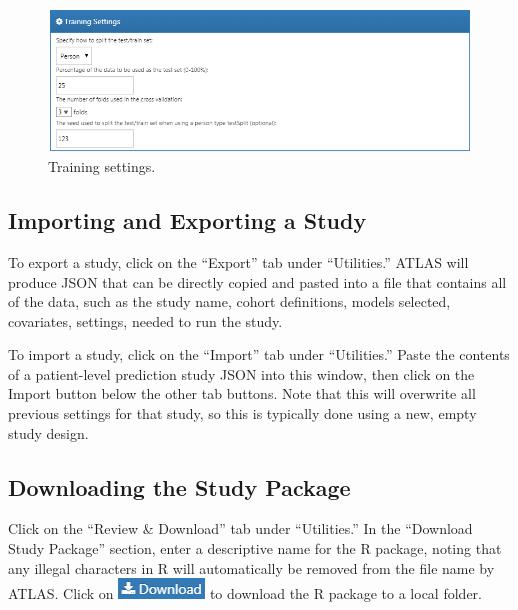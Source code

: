 \documentclass[
  11pt]{book}
\theoremstyle{definition}
\theoremstyle{definition}
\theoremstyle{definition}
\theoremstyle{definition}
\theoremstyle{remark}
\begin{document}
\begin{figure}

{\centering \includegraphics[width=1\linewidth]{images/PatientLevelPrediction/trainingSettings} 

}

\caption{Training settings.}\label{fig:trainingSettings}
\end{figure}

\subsection{Importing and Exporting a Study}\label{importing-and-exporting-a-study}

To export a study, click on the ``Export'' tab under ``Utilities.'' ATLAS will produce JSON that can be directly copied and pasted into a file that contains all of the data, such as the study name, cohort definitions, models selected, covariates, settings, needed to run the study.

To import a study, click on the ``Import'' tab under ``Utilities.'' Paste the contents of a patient-level prediction study JSON into this window, then click on the Import button below the other tab buttons. Note that this will overwrite all previous settings for that study, so this is typically done using a new, empty study design.

\subsection{Downloading the Study Package}\label{downloading-the-study-package}

Click on the ``Review \& Download'' tab under ``Utilities.'' In the ``Download Study Package'' section, enter a descriptive name for the R package, noting that any illegal characters in R will automatically be removed from the file name by ATLAS. Click on \includegraphics{images/PatientLevelPrediction/download.png} to download the R package to a local folder.
\end{document}

